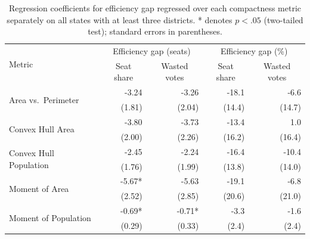 \documentclass[12pt]{article}
\begin{document}
  \begin{table}
    \begin{center}
      \begin{tabular}{lrrrr}\toprule
        \multirow{2}{*}{Metric} & \multicolumn{2}{c}{Efficiency gap (seats)} & \multicolumn{2}{c}{Efficiency gap (\%)} \\
               & \multicolumn{1}{c}{Seat share} & \multicolumn{1}{c}{Wasted votes} & \multicolumn{1}{c}{Seat share} & \multicolumn{1}{c}{Wasted votes} \\\midrule
        \multirow{2}{*}{Area vs.~Perimeter} & -3.24 & -3.26 & -18.1 & -6.6 \\
        & (1.81) & (2.04) & (14.4) & (14.7) \\\midrule
        \multirow{2}{*}{Convex Hull Area} & -3.80 & -3.73 & -13.4 & 1.0 \\
        & (2.00) & (2.26) & (16.2) & (16.4) \\\midrule
        \multirow{2}{*}{Convex Hull Population} & -2.45 & -2.24 & -16.4 & -10.4 \\
        & (1.76) & (1.99) & (13.8) & (14.0) \\\midrule
        \multirow{2}{*}{Moment of Area} & -5.67* & -5.63 & -19.1 & -6.8 \\
        & (2.52) & (2.85) & (20.6) & (21.0) \\\midrule
        \multirow{2}{*}{Moment of Population} & -0.69* & -0.71* & -3.3 & -1.6 \\
        & (0.29) & (0.33) & (2.4) & (2.4) \\\bottomrule
      \end{tabular}
      \caption{Regression coefficients for efficiency gap regressed over each compactness metric separately on all states with at least three districts.  * denotes $p<.05$ (two-tailed test); standard errors in parentheses.\label{t:efficiency3}}
    \end{center}
  \end{table}
  
\end{document}
